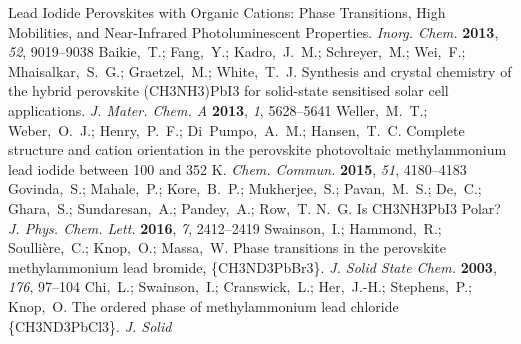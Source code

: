 \documentclass[journal=jpccck,manuscript=article,layout=twocolumn]{achemso}
\begin{document}
\begin{mcitethebibliography}{62}
  Lead Iodide Perovskites with Organic Cations: Phase Transitions, High
  Mobilities, and Near-Infrared Photoluminescent Properties. \emph{Inorg.
  Chem.} \textbf{2013}, \emph{52}, 9019--9038\relax
\mciteBstWouldAddEndPuncttrue
\mciteSetBstMidEndSepPunct{\mcitedefaultmidpunct}
{\mcitedefaultendpunct}{\mcitedefaultseppunct}\relax
\EndOfBibitem
{}
Baikie,~T.; Fang,~Y.; Kadro,~J.~M.; Schreyer,~M.; Wei,~F.; Mhaisalkar,~S.~G.;
  Graetzel,~M.; White,~T.~J. Synthesis and crystal chemistry of the hybrid
  perovskite (CH3NH3)PbI3 for solid-state sensitised solar cell applications.
  \emph{J. Mater. Chem. A} \textbf{2013}, \emph{1}, 5628--5641\relax
\mciteBstWouldAddEndPuncttrue
\mciteSetBstMidEndSepPunct{\mcitedefaultmidpunct}
{\mcitedefaultendpunct}{\mcitedefaultseppunct}\relax
\EndOfBibitem
{}
Weller,~M.~T.; Weber,~O.~J.; Henry,~P.~F.; Di~Pumpo,~A.~M.; Hansen,~T.~C.
  Complete structure and cation orientation in the perovskite photovoltaic
  methylammonium lead iodide between 100 and 352 K. \emph{Chem. Commun.}
  \textbf{2015}, \emph{51}, 4180--4183\relax
\mciteBstWouldAddEndPuncttrue
\mciteSetBstMidEndSepPunct{\mcitedefaultmidpunct}
{\mcitedefaultendpunct}{\mcitedefaultseppunct}\relax
\EndOfBibitem
{}
Govinda,~S.; Mahale,~P.; Kore,~B.~P.; Mukherjee,~S.; Pavan,~M.~S.; De,~C.;
  Ghara,~S.; Sundaresan,~A.; Pandey,~A.; Row,~T. N.~G.   Is
  CH3NH3PbI3 Polar? \emph{J. Phys. Chem. Lett.} \textbf{2016}, \emph{7},
  2412--2419\relax
\mciteBstWouldAddEndPuncttrue
\mciteSetBstMidEndSepPunct{\mcitedefaultmidpunct}
{\mcitedefaultendpunct}{\mcitedefaultseppunct}\relax
\EndOfBibitem
{}
Swainson,~I.; Hammond,~R.; Soullière,~C.; Knop,~O.; Massa,~W. Phase
  transitions in the perovskite methylammonium lead bromide, \{CH3ND3PbBr3\}.
  \emph{J. Solid State Chem.} \textbf{2003}, \emph{176}, 97--104\relax
\mciteBstWouldAddEndPuncttrue
\mciteSetBstMidEndSepPunct{\mcitedefaultmidpunct}
{\mcitedefaultendpunct}{\mcitedefaultseppunct}\relax
\EndOfBibitem
{}
Chi,~L.; Swainson,~I.; Cranswick,~L.; Her,~J.-H.; Stephens,~P.; Knop,~O. The
  ordered phase of methylammonium lead chloride \{CH3ND3PbCl3\}. \emph{J. Solid
}
\end{mcitethebibliography}
\end{document}
